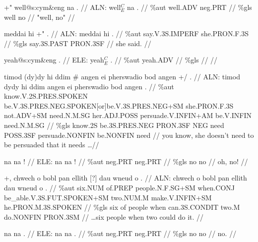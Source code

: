 \documentclass[a4paper,10pt]{article}
\begin{document}
\ex
\begingl[lingstyle=gergl]
\glchat +" well@s:cym\&eng na . //
\glsurface ALN:  well$^{C}_{E}$ na .  //
\glauto \%aut  well{\scriptsize .ADV} neg{\scriptsize .PRT}   //
\glmanual \%gls  well no   //
\gleng "well, no" //
\endgl
\xe

\ex
\begingl[lingstyle=gergl]
\glchat meddai hi +" . //
\glsurface ALN:  meddai hi .  //
\glauto \%aut  say{\scriptsize .V.3S.IMPERF} she{\scriptsize .PRON.F.3S}   //
\glmanual \%gls  say{\scriptsize .3S.PAST} PRON{\scriptsize .3SF}   //
\gleng she said. //
\endgl
\xe

\ex
\begingl[lingstyle=gergl]
\glchat yeah@s:cym\&eng . //
\glsurface ELE:  yeah$^{C}_{E}$ .  //
\glauto \%aut  yeah{\scriptsize .ADV}   //
\glmanual \%gls     //
\gleng  //
\endgl
\xe

\ex
\begingl[lingstyle=gergl]
\glchat timod (dy)dy hi ddim \# angen ei pherswadio bod angen +/ . //
\glsurface ALN:  timod dydy hi ddim angen ei pherswadio bod angen .  //
\glauto \%aut  know{\scriptsize .V.2S.PRES.SPOKEN} be{\scriptsize .V.3S.PRES.NEG.SPOKEN[or]be.V.3S.PRES.NEG+SM} she{\scriptsize .PRON.F.3S} not{\scriptsize .ADV+SM} need{\scriptsize .N.M.SG} her{\scriptsize .ADJ.POSS} persuade{\scriptsize .V.INFIN+AM} be{\scriptsize .V.INFIN} need{\scriptsize .N.M.SG}   //
\glmanual \%gls  know{\scriptsize .2S} be{\scriptsize .3S.PRES.NEG} PRON{\scriptsize .3SF} NEG need POSS{\scriptsize .3SF} persuade{\scriptsize .NONFIN} be{\scriptsize .NONFIN} need   //
\gleng you know, she doesn't need to be persuaded that it needs \dots  //
\endgl
\xe

\ex
\begingl[lingstyle=gergl]
\glchat na na ! //
\glsurface ELE:  na na !  //
\glauto \%aut  neg{\scriptsize .PRT} neg{\scriptsize .PRT}   //
\glmanual \%gls  no no   //
\gleng oh, no! //
\endgl
\xe

\ex
\begingl[lingstyle=gergl]
\glchat +, chwech o bobl pan ellith [?] dau wneud o . //
\glsurface ALN:  chwech o bobl pan ellith dau wneud o .  //
\glauto \%aut  six{\scriptsize .NUM} of{\scriptsize .PREP} people{\scriptsize .N.F.SG+SM} when{\scriptsize .CONJ} be\_able{\scriptsize .V.3S.FUT.SPOKEN+SM} two{\scriptsize .NUM.M} make{\scriptsize .V.INFIN+SM} he{\scriptsize .PRON.M.3S.SPOKEN}   //
\glmanual \%gls  six of people when can{\scriptsize .3S.CONDIT} two{\scriptsize .M} do{\scriptsize .NONFIN} PRON{\scriptsize .3SM}   //
\gleng  \dots six people when two could do it. //
\endgl
\xe

\ex
\begingl[lingstyle=gergl]
\glchat na na . //
\glsurface ELE:  na na .  //
\glauto \%aut  neg{\scriptsize .PRT} neg{\scriptsize .PRT}   //
\glmanual \%gls  no no   //
\gleng no. //
\endgl
\xe
\end{document}
